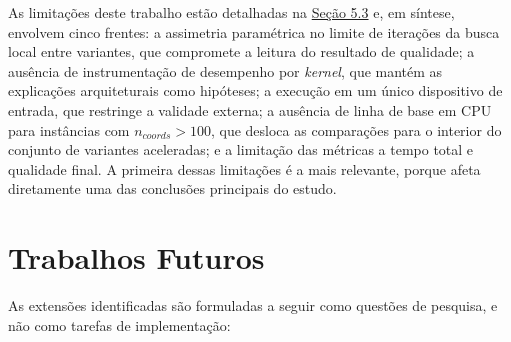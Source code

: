 As limitações deste trabalho estão detalhadas na \hyperref[sec-53-ameacas-validade]{Seção 5.3} e, em síntese, envolvem cinco frentes: a assimetria paramétrica no limite de iterações da busca local entre variantes, que compromete a leitura do resultado de qualidade; a ausência de instrumentação de desempenho por \emph{kernel}, que mantém as explicações arquiteturais como hipóteses; a execução em um único dispositivo de entrada, que restringe a validade externa; a ausência de linha de base em CPU para instâncias com \(n_{coords} > 100\), que desloca as comparações para o interior do conjunto de variantes aceleradas; e a limitação das métricas a tempo total e qualidade final.
A primeira dessas limitações é a mais relevante, porque afeta diretamente uma das conclusões principais do estudo.

\section{Trabalhos Futuros}\label{sec-64-trabalhos-futuros}

As extensões identificadas são formuladas a seguir como questões de pesquisa, e não como tarefas de implementação:

